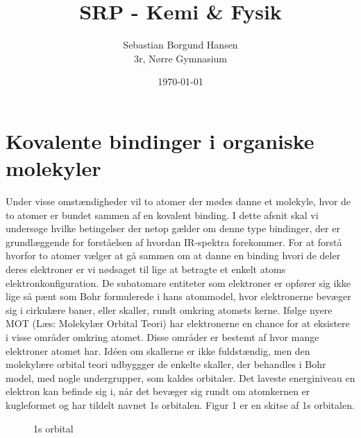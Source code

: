 \documentclass[12pt,a4paper]{article}
\author{Sebastian Borgund Hansen \\ 3r, Nørre Gymnasium}
\title{SRP - Kemi \& Fysik}
\date{\today}
\theoremstyle{break}
\theoremstyle{nonumberplain}
\begin{document}
\maketitle
\section{Kovalente bindinger i organiske molekyler}

Under visse omstændigheder vil to atomer der mødes danne et molekyle, hvor de to atomer er bundet sammen af en kovalent binding. I dette afsnit skal vi undersøge hvilke betingelser der netop gælder om denne type bindinger, der er grundlæggende for forståelsen af hvordan IR-spektra forekommer. For at forstå hvorfor to atomer vælger at gå sammen om at danne en binding hvori de deler deres elektroner er vi nødsaget til lige at betragte et enkelt atoms elektronkonfiguration. De subatomare entiteter som elektroner er opfører sig ikke lige så pænt som Bohr formulerede i hans atommodel, hvor elektronerne bevæger sig i cirkulære baner, eller skaller, rundt omkring atomets kerne. Ifølge nyere MOT (Læs: Molekylær Orbital Teori) har elektronerne en chance for at eksistere i visse områder omkring atomet. Disse områder er bestemt af hvor mange elektroner atomet har. Idéen om skallerne er ikke fuldstændig, men den molekylære orbital teori udbyggger de enkelte skaller, der behandles i Bohr model, med nogle undergrupper, som kaldes orbitaler. Det laveste energiniveau en elektron kan befinde sig i, når det bevæger sig rundt om atomkernen er kugleformet og har tildelt navnet 1s orbitalen. Figur 1 er en skitse af 1s orbitalen. 

\begin{figure}[ht!]
  \centering
  \caption{1s orbital} \end{figure}
  
\end{document}
